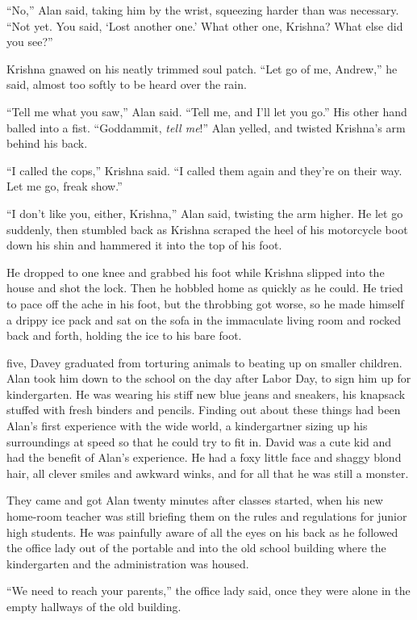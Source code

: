 ``No,'' Alan said, taking him by the wrist, squeezing harder than was
necessary.  ``Not yet.  You said, `Lost another one.' What other one,
Krishna?  What else did you see?''

Krishna gnawed on his neatly trimmed soul patch.  ``Let go of me,
Andrew,'' he said, almost too softly to be heard over the rain.

``Tell me what you saw,'' Alan said.  ``Tell me, and I'll let you
go.'' His other hand balled into a fist.  ``Goddammit, \textit{tell
me}!'' Alan yelled, and twisted Krishna's arm behind his back.

``I called the cops,'' Krishna said.  ``I called them again and
they're on their way.  Let me go, freak show.''

``I don't like you, either, Krishna,'' Alan said, twisting the arm
higher.  He let go suddenly, then stumbled back as Krishna scraped the
heel of his motorcycle boot down his shin and hammered it into the top
of his foot.

He dropped to one knee and grabbed his foot while Krishna slipped into
the house and shot the lock.  Then he hobbled home as quickly as he
could.  He tried to pace off the ache in his foot, but the throbbing
got worse, so he made himself a drippy ice pack and sat on the sofa in
the immaculate living room and rocked back and forth, holding the ice
to his bare foot.

 five, Davey graduated from torturing animals to beating up on
smaller children.  Alan took him down to the school on the day after
Labor Day, to sign him up for kindergarten.  He was wearing his stiff
new blue jeans and sneakers, his knapsack stuffed with fresh binders
and pencils.  Finding out about these things had been Alan's first
experience with the wide world, a kindergartner sizing up his
surroundings at speed so that he could try to fit in.  David was a
cute kid and had the benefit of Alan's experience.  He had a foxy
little face and shaggy blond hair, all clever smiles and awkward
winks, and for all that he was still a monster.

They came and got Alan twenty minutes after classes started, when his
new home-room teacher was still briefing them on the rules and
regulations for junior high students.  He was painfully aware of all
the eyes on his back as he followed the office lady out of the
portable and into the old school building where the kindergarten and
the administration was housed.

``We need to reach your parents,'' the office lady said, once they
were alone in the empty hallways of the old building.

